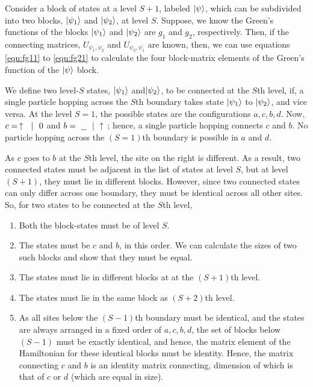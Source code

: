 	Consider a block of states at a level $ S+1 $, labeled $ \ket{\psi} $, which can be subdivided into two blocks, $ \ket{\psi_1} $ and $ \ket{\psi_2} $, at level $ S $. Suppose, we know the Green's functions of the blocks $ \ket{\psi_1} $ and $ \ket{\psi_2} $ are $ g_1 $ and $ g_2 $, respectively. Then, if the connecting matrices, $ U_{\psi_1, \psi_2} $ and $ U_{\psi_2, \psi_1} $ are known, then, we can use equations \eqref{eqn:fg11} to \eqref{eqn:fg21} to calculate the four block-matrix elements of the Green's function of the $ \ket{\psi} $ block.
	
	We define two level-$ S $ states, $ \ket{\psi_1} $ and$  \ket{\psi_2} $, to be connected at the $ S $th level, if, a single particle hopping across the $ S $th boundary takes state $ \ket{\psi_1} $ to $ \ket{\psi_2} $, and vice versa. At the level $ S = 1 $, the possible states are the configurations $ a, c, b, d $. Now, $ c =\, \uparrow\  \ |\ \ 0 $ and $ b = \ \underline{\ \ }\  \ |\  \uparrow\  $; hence, a single particle hopping connects $ c $ and $ b $. No particle hopping across the $ (S = 1) $th boundary is possible in $ a $ and $ d $.
	
	As $ c $ goes to $ b $ at the $ S $th level, the site on the right is different. As a result, two connected states must be adjacent in the list of states at level $ S $, but at level $ (S+1) $, they must lie in different blocks. However, since two connected states can only differ across one boundary, they must be identical across all other sites. So, for two states to be connected at the $ S $th level,
	\begin{enumerate}
		\item Both the block-states must be of level $ S $.
		\item The states must be $ c $ and $ b $, in this order. We can calculate the sizes of two such blocks and show that they must be equal. 
		\item The states must lie in different blocks at at the $ (S+1) $th level.
		\item The states must lie in the same block as $ (S+2) $th level.
		\item As all sites below the $ (S-1) $th boundary must be identical, and the states are always arranged in a fixed order of $ a, c, b, d $, the set of blocks below $ (S-1) $ must be exactly identical, and hence, the matrix element of the Hamiltonian for these identical blocks must be identity. Hence, the matrix connecting $ c $ and $ b $ is an identity matrix connecting, dimension of which is that of $ c $ or $ d $ (which are equal in size).
	\end{enumerate}
	
